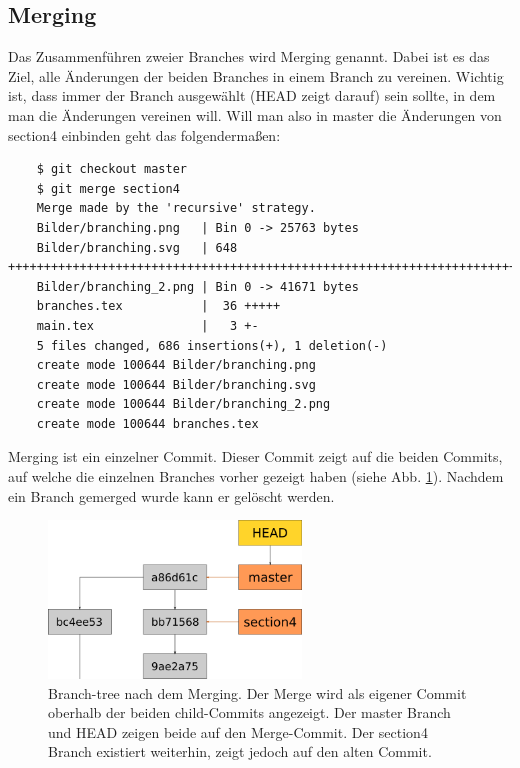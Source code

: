 \subsection{Merging}
Das Zusammenführen zweier Branches wird Merging genannt. Dabei ist es das Ziel, alle Änderungen der beiden Branches in einem Branch zu vereinen. Wichtig ist, dass immer der Branch ausgewählt (HEAD zeigt darauf) sein sollte, in dem man die Änderungen vereinen will. Will man also in master die Änderungen von section4 einbinden geht das folgendermaßen:
\begin{lstlisting}
	$ git checkout master
	$ git merge section4
	Merge made by the 'recursive' strategy.
	Bilder/branching.png   | Bin 0 -> 25763 bytes
	Bilder/branching.svg   | 648 ++++++++++++++++++++++++++++++++++++++++++++++++++++++++++++++++++++++++++
	Bilder/branching_2.png | Bin 0 -> 41671 bytes
	branches.tex           |  36 +++++
	main.tex               |   3 +-
	5 files changed, 686 insertions(+), 1 deletion(-)
	create mode 100644 Bilder/branching.png
	create mode 100644 Bilder/branching.svg
	create mode 100644 Bilder/branching_2.png
	create mode 100644 branches.tex
\end{lstlisting}
Merging ist ein einzelner Commit. Dieser Commit zeigt auf die beiden Commits, auf welche die einzelnen Branches vorher gezeigt haben (siehe Abb. \ref{fig:merge}). Nachdem ein Branch gemerged wurde kann er gelöscht werden.
\begin{figure}[!ht]
	\centering
	\includegraphics[width=0.6\textwidth]{Bilder/branching_3.png}
	\caption{Branch-tree nach dem Merging. Der Merge wird als eigener Commit oberhalb der beiden child-Commits angezeigt. Der master Branch und HEAD zeigen beide auf den Merge-Commit. Der section4 Branch existiert weiterhin, zeigt jedoch auf den alten Commit.}
	\label{fig:merge}
\end{figure}